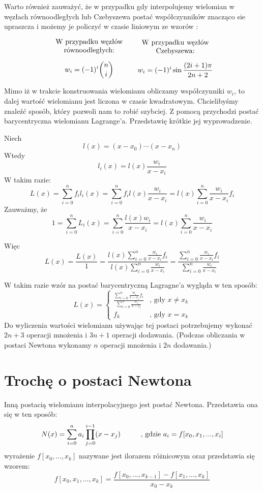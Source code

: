 \documentclass[a4paper]{article}
\begin{document}
Warto również zauważyć, że w przypadku gdy interpolujemy wielomian w węzłach równoodległych lub Czebyszewa
postać współczynników znacząco sie upraszcza i możemy je policzyć w czasie liniowym ze wzorów \cite{2} :

\[
  \begin{minipage}{.35\linewidth}
    \centering
    W przypadku węzłów równoodległych:
    $$ w_i = (-1)^i\binom{n}{i}$$
  \end{minipage}
  \begin{minipage}{.35\linewidth}
    \centering
    W przypadku węzłów Czebyszewa:
    $$ w_i = (-1)^i\sin{\frac{(2i+1)\pi}{2n+2}}$$
  \end{minipage}
\]

Mimo iż w trakcie konstruowania wielomianu obliczamy współczynniki $w_i$, to dalej wartość wielomianu
jest liczona w czasie kwadratowym. Chcielibyśmy znaleźć sposób, który pozwoli nam to robić szybciej.
Z pomocą przychodzi postać barycentryczna wielomianu Lagrange'a. Przedstawię krótkie jej wyprowadzenie.

Niech $$l(x) = (x - x_0) \cdots (x - x_n)$$ 
Wtedy $$l_i(x) = l(x)\frac{w_i}{x-x_i}$$
W takim razie:
$$ L(x) = \sum_{i=0}^{n}f_il_i(x) = \sum_{i=0}^nf_il(x)\frac{w_i}{x-x_i} = 
          l(x)\sum_{i=0}^n\frac{w_i}{x-x_i}f_i $$
Zauważmy, że 
$$ 1 = \sum_{i=0}^nL_i(x) = \sum_{i=0}^n\frac{l(x)w_i}{x-x_i} = l(x)\sum_{i=0}^n\frac{w_i}{x-x_i}$$

Więc
$$  L(x) = \frac{L(x)}{1} = 
\frac{l\displaystyle(x)\sum_{i=0}^n\frac{w_i}{x-x_i}f_i}{l\displaystyle(x)\sum_{i=0}^n\frac{w_i}{x-x_i}} = 
\frac{\displaystyle\sum_{i=0}^n\frac{w_i}{x-x_i}f_i}{\displaystyle\sum_{i=0}^n\frac{w_i}{x-x_i}}$$

W takim razie wzór na postać barycentryczną Lagragne'a wygląda w ten sposób:
$$ L(x) = 
          \begin{cases}
            \frac{\displaystyle\sum_{i=0}^n \frac{w_i}{x - x_i}f_i}{\displaystyle\sum_{i=0}^n \frac{w_i}{x - x_i}} & \text{, gdy } x \neq x_k \\
              f_k & \text{, gdy } x = x_k
          \end{cases}
        $$
Do wyliczenia wartości wielomianu używając tej postaci potrzebujemy wykonać 
$2n+3$ operacji mnożenia i $3n+1$ operacji dodawania. (Podczas obliczania 
w postaci Newtona wykonamy $n$ operacji mnożenia i $2n$ dodawania.)


\section{Trochę o postaci Newtona}
Inną postacią wielomianu interpolacyjnego jest postać Newtona. Przedstawia ona się
w ten sposób:
$$ N(x) = \sum_{i=0}^n a_i \prod_{j = 0}^{i-1}(x - x_j) \text{\hspace{1cm}, gdzie }
a_i = f[x_0, x_1, ..., x_i]$$
wyrażenie $ f[x_0, ..., x_k] $ nazywane jest ilorazem różnicowym oraz przedstawia 
się wzorem:
$$ f[x_0, x_1, ..., x_k] = \frac{f[x_0, ..., x_{k-1}] - f[x_1, ..., x_k]}{x_0 - x_k}$$
\end{document}
